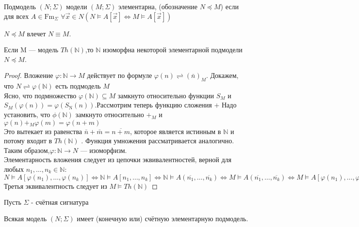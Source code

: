 \begin{definition}
    Подмодель $(N ;\Sigma)$ модели $(M ;\Sigma)$ элементарна, (обозначение $N \preccurlyeq M$) если для всех $A \in \mathrm{Fm}_{\Sigma}$ $\forall \vec{x} \in N(N \vDash A[\vec{x}] \Longleftrightarrow M \vDash A[\vec{x}])$
\end{definition}
\begin{proposition}
    $N \preccurlyeq M$ влечет $N \equiv M$.
\end{proposition}
\begin{example}
Если M — модель $Th(\mathbb{N})$,то $\mathbb{N}$ изоморфна некоторой элементарной подмодели  $N \preccurlyeq M$.
\end{example}
\begin{proof}
    Вложение $\varphi: \mathbb{N} \rightarrow M$ действует по формуле $\varphi(n) \rightleftharpoons(\bar{n})_{M}$.
    Докажем, что $N \rightleftharpoons \varphi(\mathbb{N})$
    есть подмодель $M$
    \\Ясно, что подмножество $\varphi(\mathbb{N}) \subseteq M$ замкнуто относительно функции $S_M$ и $S_{M}(\varphi(n))=\varphi\left(S_{\mathrm{N}}(n)\right)$.Рассмотрим теперь функцию сложения $+$  Надо установить, что $\phi(\mathbb{N})$ замкнуто относительно $+_M$ и 
    \\$\varphi(n)+_{M} \varphi(m)=\varphi(n+m)$\\
    Это вытекает из равенства $\bar{n}+\bar{m}=\overline{n+m}$, которое является истинным в $\mathbb{N}$
    и потому входит в $Th(\mathbb{N})$ . Функция умножения рассматривается аналогично.
    Таким образом,$\varphi: \mathbb{N} \rightarrow N$  — изоморфизм.\\
    Элементарность вложения следует из цепочки эквивалентностей, верной для любых $n_{1}, \dots, n_{k} \in \mathbb{N}$:\\
    $N \vDash A\left[\varphi\left(n_{1}\right), \ldots, \varphi\left(n_{k}\right)\right] \Longleftrightarrow \mathbb{N} \vDash A\left[n_{1}, \ldots, n_{k}\right] \Longleftrightarrow \mathbb{N} \vDash A(\overline{n_{1}}, \ldots, \overline{n_{k}})\Longleftrightarrow M \vDash A(\overline{n_{1}}, \ldots, \overline{n_{k}}) \Longleftrightarrow M \vDash A\left[\varphi\left(n_{1}\right), \ldots, \varphi\left(n_{k}\right)\right]$\\
    Третья эквивалентность следует из $M \vDash T h(\mathbb{N})$
\end{proof}
Пусть $\Sigma$ - счётная сигнатура\\
\begin{theorem}
    Всякая модель  $(N ;\Sigma)$ имеет (конечную или) счётную элементарную подмодель.
\end{theorem}
